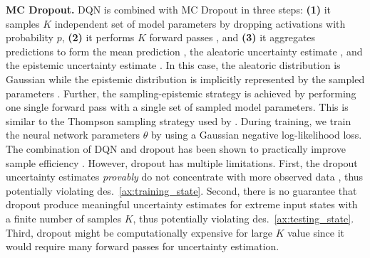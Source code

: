\textbf{MC Dropout.} DQN is combined with MC Dropout \cite{drop_out} in three steps: \textbf{(1)} it samples $K$ independent set of model parameters  by dropping activations with probability $p$, \textbf{(2)} it performs $K$ forward passes , and \textbf{(3)} it aggregates predictions to form the mean prediction , the aleatoric uncertainty estimate , and the epistemic uncertainty estimate . In this case, the aleatoric distribution is Gaussian while the epistemic distribution is implicitly represented by the sampled parameters . Further, the sampling-epistemic strategy is achieved by performing one single forward pass with a single set of sampled model parameters. This is similar to the Thompson sampling strategy used by \citet{dropout}. During training, we train the neural network parameters $\theta$ by using a Gaussian negative log-likelihood loss. The combination of DQN and dropout has been shown to practically improve sample efficiency \cite{dropout}. However, dropout has multiple limitations. First, the dropout uncertainty estimates \emph{provably} do not concentrate with more observed data \cite{randomized-prior-functions}, thus potentially violating des.~\ref{ax:training_state}. Second, there is no guarantee that dropout produce meaningful uncertainty estimates for extreme input states with a finite number of samples $K$, thus potentially violating des.~\ref{ax:testing_state}. Third, dropout might be computationally expensive for large $K$ value since it would require many forward passes for uncertainty estimation.

